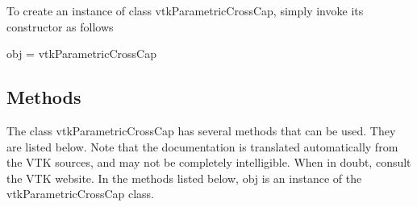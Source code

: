 To create an instance of class vtk\-Parametric\-Cross\-Cap, simply invoke its constructor as follows \begin{DoxyVerb}  obj = vtkParametricCrossCap
\end{DoxyVerb}
 \hypertarget{vtkwidgets_vtkxyplotwidget_Methods}{}\subsection{Methods}\label{vtkwidgets_vtkxyplotwidget_Methods}
The class vtk\-Parametric\-Cross\-Cap has several methods that can be used. They are listed below. Note that the documentation is translated automatically from the V\-T\-K sources, and may not be completely intelligible. When in doubt, consult the V\-T\-K website. In the methods listed below, {\ttfamily obj} is an instance of the vtk\-Parametric\-Cross\-Cap class. 
